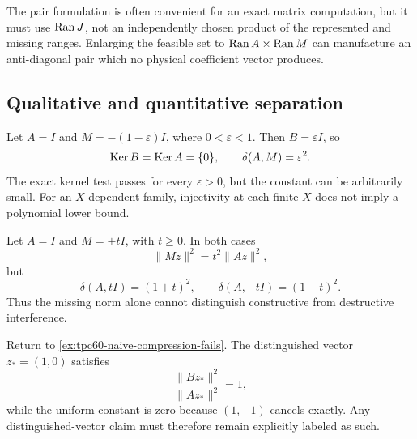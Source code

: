 The pair formulation is often convenient for an exact matrix computation,
but it must use \(\operatorname{Ran} J\), not an independently chosen product of the
represented and missing ranges.  Enlarging the feasible set to
\(\operatorname{Ran} A\times\operatorname{Ran} M\) can manufacture an anti-diagonal pair which no
physical coefficient vector produces.

\subsection{Qualitative and quantitative separation}

\begin{example}
\label{ex:tpc60-kernel-no-quantitative}
Let \(A=I\) and \(M=-(1-\varepsilon)I\), where
\(0<\varepsilon<1\).  Then \(B=\varepsilon I\), so
\begin{equation}
 \operatorname{Ker} B=\operatorname{Ker} A=\{0\},
 \qquad
 \delta(A,M)=\varepsilon^2.
 \label{eq:tpc60-epsilon-example}
\end{equation}
The exact kernel test passes for every \(\varepsilon>0\), but the constant
can be arbitrarily small.  For an \(X\)-dependent family, injectivity at
each finite \(X\) does not imply a polynomial lower bound.
\end{example}

\begin{example}
\label{ex:tpc60-same-mass-opposite-phase}
Let \(A=I\) and \(M=\pm tI\), with \(t\ge0\).  In both cases
\begin{equation}
 \|Mz\|^2=t^2\|Az\|^2,
 \label{eq:tpc60-same-raw-mass}
\end{equation}
but
\begin{equation}
 \delta(A,tI)=(1+t)^2,
 \qquad
 \delta(A,-tI)=(1-t)^2.
 \label{eq:tpc60-opposite-phase-constants}
\end{equation}
Thus the missing norm alone cannot distinguish constructive from
destructive interference.
\end{example}

\begin{example}
\label{ex:tpc60-pointwise-not-uniform}
Return to \cref{ex:tpc60-naive-compression-fails}.  The distinguished
vector \(z_*=(1,0)\) satisfies
\begin{equation}
 \frac{\|Bz_*\|^2}{\|Az_*\|^2}=1,
 \label{eq:tpc60-distinguished-success-example}
\end{equation}
while the uniform constant is zero because \((1,-1)\) cancels exactly.
Any distinguished-vector claim must therefore remain explicitly labeled
as such.
\end{example}

